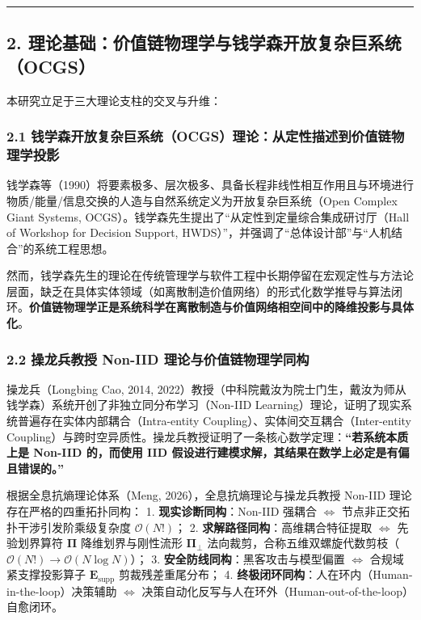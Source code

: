 \documentclass[
]{article}
\begin{document}
\begin{center}\rule{0.5\linewidth}{0.5pt}\end{center}

\subsection{2.
理论基础：价值链物理学与钱学森开放复杂巨系统（OCGS）}\label{ux7406ux8bbaux57faux7840ux4ef7ux503cux94feux7269ux7406ux5b66ux4e0eux94b1ux5b66ux68eeux5f00ux653eux590dux6742ux5de8ux7cfbux7edfocgs}

本研究立足于三大理论支柱的交叉与升维：

\subsubsection{2.1
钱学森开放复杂巨系统（OCGS）理论：从定性描述到价值链物理学投影}\label{ux94b1ux5b66ux68eeux5f00ux653eux590dux6742ux5de8ux7cfbux7edfocgsux7406ux8bbaux4eceux5b9aux6027ux63cfux8ff0ux5230ux4ef7ux503cux94feux7269ux7406ux5b66ux6295ux5f71}

钱学森等（1990）将要素极多、层次极多、具备长程非线性相互作用且与环境进行物质/能量/信息交换的人造与自然系统定义为开放复杂巨系统（Open
Complex Giant Systems,
OCGS）。钱学森先生提出了``从定性到定量综合集成研讨厅（Hall of Workshop
for Decision Support,
HWDS）''，并强调了``总体设计部''与``人机结合''的系统工程思想。

然而，钱学森先生的理论在传统管理学与软件工程中长期停留在宏观定性与方法论层面，缺乏在具体实体领域（如离散制造价值网络）的形式化数学推导与算法闭环。\textbf{价值链物理学正是系统科学在离散制造与价值网络相空间中的降维投影与具体化}。

\subsubsection{2.2 操龙兵教授 Non-IID
理论与价值链物理学同构}\label{ux64cdux9f99ux5175ux6559ux6388-non-iid-ux7406ux8bbaux4e0eux4ef7ux503cux94feux7269ux7406ux5b66ux540cux6784}

操龙兵（Longbing Cao, 2014,
2022）教授（中科院戴汝为院士门生，戴汝为师从钱学森）系统开创了非独立同分布学习（Non-IID
Learning）理论，证明了现实系统普遍存在实体内部耦合（Intra-entity
Coupling）、实体间交互耦合（Inter-entity
Coupling）与跨时空异质性。操龙兵教授证明了一条核心数学定理：\textbf{``若系统本质上是
Non-IID 的，而使用 IID
假设进行建模求解，其结果在数学上必定是有偏且错误的。''}

根据全息抗熵理论体系（Meng, 2026），全息抗熵理论与操龙兵教授 Non-IID
理论存在严格的四重拓扑同构： 1. \textbf{现实诊断同构}：Non-IID 强耦合
\(\iff\) 节点非正交拓扑干涉引发阶乘级复杂度 \(\mathcal{O}(N!)\)； 2.
\textbf{求解路径同构}：高维耦合特征提取 \(\iff\) 先验划界算符
\(\mathbf{\Pi}\) 降维划界与刚性流形 \(\mathbf{\Pi}_\bot\)
法向裁剪，合称五维双螺旋代数剪枝（\(\mathcal{O}(N!) \to \mathcal{O}(N \log N)\)）；
3. \textbf{安全防线同构}：黑客攻击与模型偏置 \(\iff\)
合规域紧支撑投影算子 \(\mathbf{E}_{\mathrm{supp}}\) 剪裁残差重尾分布；
4. \textbf{终极闭环同构}：人在环内（Human-in-the-loop）决策辅助 \(\iff\)
决策自动化反写与人在环外（Human-out-of-the-loop）自愈闭环。
\end{document}

